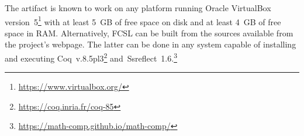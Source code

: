\documentclass[a4paper,USenglish]{darts}
\begin{document}
\begin{platforms}
  The artifact is known to work on any platform running Oracle
  VirtualBox version~5\footnote{\url{https://www.virtualbox.org/}}
  with at least 5~GB of free space on disk and at least 4~GB of free
  space in RAM. Alternatively, FCSL can be built from the sources
  available from the project's webpage. The latter can be done in any
  system capable of installing and executing
  Coq~v.8.5pl3\footnote{\url{https://coq.inria.fr/coq-85}}
  and~Ssreflect~1.6.\footnote{\url{https://math-comp.github.io/math-comp/}}
\end{platforms}





\end{document}
